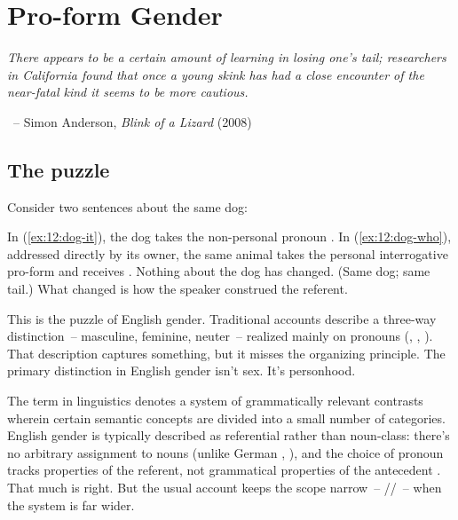 \chapter{Pro-form Gender}
\label{ch:proform-gender}


\epigraph{\textit{There appears to be a certain amount of learning in losing one's tail; researchers in California found that once a young skink has had a close encounter of the near-fatal kind it seems to be more cautious.}}{~-- Simon Anderson, \textit{Blink of a Lizard} (2008)}

\section{The puzzle}
\label{sec:12:hook}

Consider two sentences about the same dog:

\z
{}
\z
In (\ref{ex:12:dog-it}), the dog takes the non-personal pronoun . In (\ref{ex:12:dog-who}), addressed directly by its owner, the same animal takes the personal interrogative pro-form  and receives . Nothing about the dog has changed. (Same dog; same tail.) What changed is how the speaker construed the referent.

This is the puzzle of English gender. Traditional accounts describe a three-way distinction~-- masculine, feminine, neuter~-- realized mainly on pronouns (, , ). That description captures something, but it misses the organizing principle. The primary distinction in English gender isn't sex. It's personhood.

The term  in linguistics denotes a system of grammatically relevant contrasts wherein certain semantic concepts are divided into a small number of categories. English gender is typically described as referential rather than noun-class: there's no arbitrary assignment to nouns (unlike German , ), and the choice of pronoun tracks properties of the referent, not grammatical properties of the antecedent \autocite{corbett1991,huddleston2002}. That much is right. But the usual account keeps the scope narrow~-- //~-- when the system is far wider.

